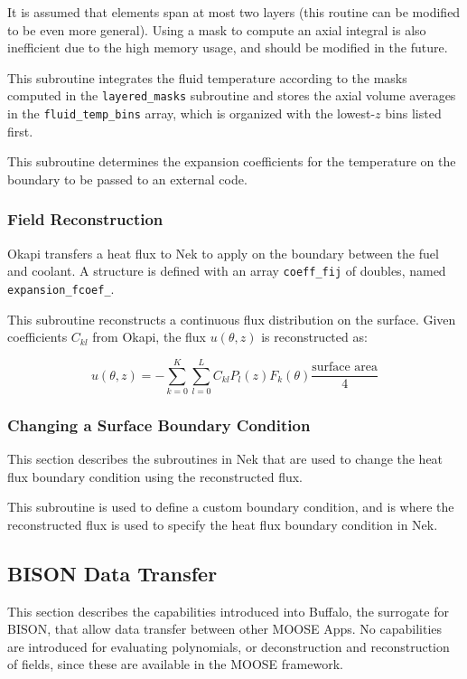 \documentclass[10pt]{article}
\newcommand{\beq}{\begin{equation}}
\newcommand{\eeq}{\end{equation}}
\newcounter{subsubsubsection}[subsubsection]
\numberwithin{equation}{section} %
\begin{document}
\color{magenta}
It is assumed that elements span at most two layers (this routine can be modified to be even more general). Using a mask to compute an axial integral is also inefficient due to the high memory usage, and should be modified in the future. 
\color{black}

This subroutine integrates the fluid temperature according to the masks computed in the {\tt layered\_masks} subroutine and stores the axial volume averages in the {\tt fluid\_temp\_bins} array, which is organized with the lowest-\(z\) bins listed first.

This subroutine determines the expansion coefficients for the temperature on the boundary to be passed to an external code.

\subsubsection{Field Reconstruction}
Okapi transfers a heat flux to Nek to apply on the boundary between the fuel and coolant. A structure is defined with an array {\tt coeff\_fij} of doubles, named {\tt expansion\_fcoef\_}.

This subroutine reconstructs a continuous flux distribution on the surface. Given coefficients \(C_{kl}\) from Okapi, the flux \(u(\theta, z)\) is reconstructed as:

\beq
u(\theta, z)=-\sum_{k=0}^{K}\sum_{l=0}^{L}C_{kl}P_l(z)F_k(\theta)\frac{\textrm{surface area}}{4}
\eeq

\subsubsection{Changing a Surface Boundary Condition}
This section describes the subroutines in Nek that are used to change the heat flux boundary condition using the reconstructed flux.

This subroutine is used to define a custom boundary condition, and is where the reconstructed flux is used to specify the heat flux boundary condition in Nek.

\subsection{BISON Data Transfer}
This section describes the capabilities introduced into Buffalo, the surrogate for BISON, that allow data transfer between other MOOSE Apps. No capabilities are introduced for evaluating polynomials, or deconstruction and reconstruction of fields, since these are available in the MOOSE framework.
\end{document}
